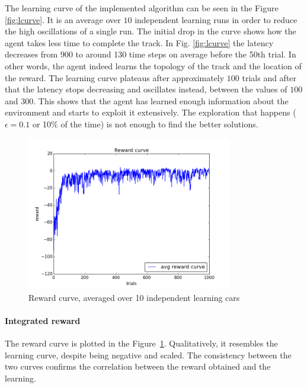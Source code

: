 The learning curve of the implemented algorithm can be seen in the
Figure \ref{fig:lcurve}. It is an average over $10$ independent learning runs in
order to reduce the high oscillations of a single run. The initial drop in the curve
shows how the agent takes less time to 
complete the track. In Fig. \ref{fig:lcurve} the latency decreases from 900 to around 130 time steps on average before the 50th trial. In other words, the agent indeed learns the topology of the track
and the location of the reward. The learning curve plateaus after
approximately $100$ trials and after that the latency stops decreasing and
oscillates instead, between the values of $100$ and $300$. This shows that the agent has learned enough information
about the environment and starts to exploit it extensively. The exploration that
happens ($\epsilon = 0.1$ or 10$\%$ of the time) is not enough to find the better solutions.

\begin{figure}[h!]
\centering
\includegraphics[width=0.8\textwidth]{figures/reward_curve.png}
\caption{\label{fig:rcurve}Reward curve, averaged over 10 independent learning
cars}
\end{figure}

\paragraph{Integrated reward}
The reward curve is plotted in the Figure~\ref{fig:rcurve}. Qualitatively, it resembles
the learning curve, despite being negative and scaled. The consistency between
the two curves confirms the correlation between the reward obtained and the
learning.

